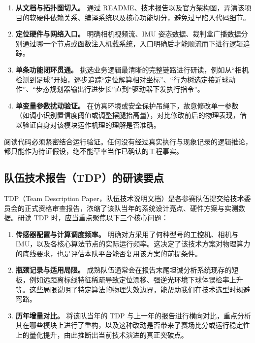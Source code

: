 \begin{enumerate}[leftmargin=*]
    \item \textbf{从文档与拓扑图切入。} 通过 README、技术报告以及官方架构图，弄清该项目的软硬件依赖关系、编译系统以及核心功能切分，避免过早陷入代码细节。
    \item \textbf{定位硬件与网络入口。} 明确相机视频流、IMU 姿态数据、裁判盒广播数据分别通过哪一个节点或函数注入机载系统，入口明确后才能顺流而下进行逻辑追踪。
    \item \textbf{单条功能闭环贯通。} 挑选业务逻辑最清晰的完整链路进行研读，例如从“相机检测到足球”开始，逐步追踪“定位解算相对坐标”、“行为树选定接近球动作”、“步态规划器输出行进步长”直到“驱动器下发执行指令”。
    \item \textbf{单变量参数扰动验证。} 在仿真环境或安全保护吊绳下，故意修改单一参数（如调小识别置信度阈值或调整摆腿抬高量），对比修改前后的物理表现，借以验证自身对该模块运作机理的理解是否准确。
\end{enumerate}

\noindent 阅读代码必须紧密结合运行验证。任何没有经过真实执行与现象记录的逻辑推论，都只能作为待证假设，绝不能草率当作已确认的工程事实。

\subsection{队伍技术报告（TDP）的研读要点}

TDP（Team Description Paper，队伍技术说明文档）是各参赛队伍提交给技术委员会的正式资格审查报告，浓缩了该队当年的系统设计亮点、硬件方案与实测数据。研读 TDP 时，应当重点聚焦以下三个核心问题：

\begin{enumerate}[leftmargin=*]
    \item \textbf{传感器配置与计算调度频率。} 明确对方采用了何种型号的工控机、相机与 IMU，以及各核心算法节点的实际运行频率。这决定了该技术方案对物理算力的底线要求，也是评估本队平台能否复用该方案的前提条件。
    \item \textbf{瓶颈记录与适用局限。} 成熟队伍通常会在报告末尾坦诚分析系统现存的短板，例如远距离标线特征稀疏导致定位漂移、强逆光环境下球体误检率上升等。这些局限说明了特定算法的物理失效边界，能帮助我们在技术选型时规避弯路。
    \item \textbf{历年增量对比。} 将该队当年的 TDP 与上一年的报告进行横向对比，重点分析其在哪些模块上进行了重构，以及这种改动是否带来了赛场比分或运行稳定性上的量化提升，由此推断出当前技术演进的真正突破点。\advice
\end{enumerate}

\newpage